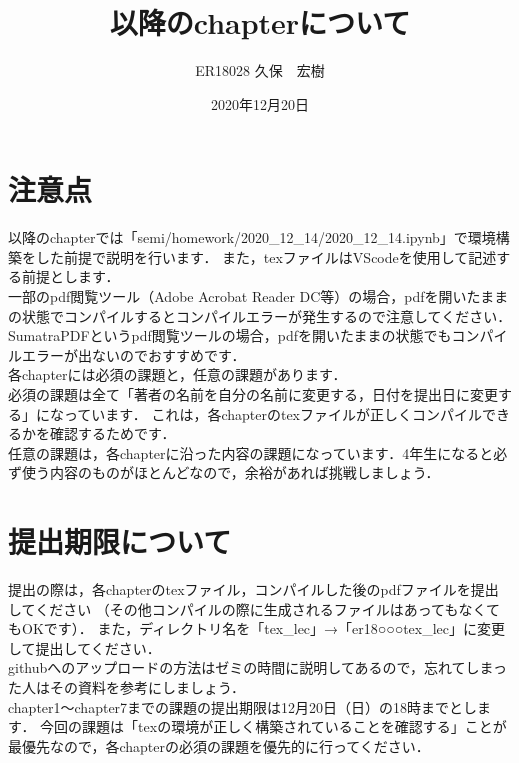 \documentclass[a4paper,10pt]{jsarticle}
\title{以降のchapterについて}%
\author{ER18028 久保　宏樹}%
\date{2020年12月20日}%
\begin{document}
\maketitle
\section{注意点}
以降のchapterでは「semi/homework/2020\_12\_14/2020\_12\_14.ipynb」で環境構築をした前提で説明を行います．
また，texファイルはVScodeを使用して記述する前提とします．\\

一部のpdf閲覧ツール（Adobe Acrobat Reader DC等）の場合，pdfを開いたままの状態でコンパイルするとコンパイルエラーが発生するので注意してください．
SumatraPDFというpdf閲覧ツールの場合，pdfを開いたままの状態でもコンパイルエラーが出ないのでおすすめです．\\

各chapterには必須の課題と，任意の課題があります．\\
必須の課題は全て「著者の名前を自分の名前に変更する，日付を提出日に変更する」になっています．
これは，各chapterのtexファイルが正しくコンパイルできるかを確認するためです．\\
任意の課題は，各chapterに沿った内容の課題になっています．4年生になると必ず使う内容のものがほとんどなので，余裕があれば挑戦しましょう．

\section{提出期限について}
提出の際は，各chapterのtexファイル，コンパイルした後のpdfファイルを提出してください
（その他コンパイルの際に生成されるファイルはあってもなくてもOKです）．
また，ディレクトリ名を「tex\_lec」→「er18○○○tex\_lec」に変更して提出してください．\\
githubへのアップロードの方法はゼミの時間に説明してあるので，忘れてしまった人はその資料を参考にしましょう．\\
chapter1～chapter7までの課題の提出期限は12月20日（日）の18時までとします．
今回の課題は「texの環境が正しく構築されていることを確認する」ことが最優先なので，各chapterの必須の課題を優先的に行ってください．
\end{document}

